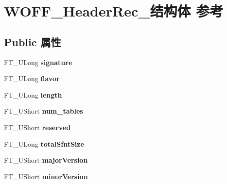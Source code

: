 \hypertarget{struct_w_o_f_f___header_rec__}{}\section{W\+O\+F\+F\+\_\+\+Header\+Rec\+\_\+结构体 参考}
\label{struct_w_o_f_f___header_rec__}
\subsection*{Public 属性}
\begin{DoxyCompactItemize}
\item 
\mbox{\label{struct_w_o_f_f___header_rec___a4ecfcefa20b9b5c897d82727293e7111}} 
F\+T\+\_\+\+U\+Long {\bfseries signature}
\item 
\mbox{\label{struct_w_o_f_f___header_rec___ac805e897e024bfe4cd363f09138e2a5a}} 
F\+T\+\_\+\+U\+Long {\bfseries flavor}
\item 
\mbox{\label{struct_w_o_f_f___header_rec___a7cade0fd6f387b1e618804af7d113c6a}} 
F\+T\+\_\+\+U\+Long {\bfseries length}
\item 
\mbox{\label{struct_w_o_f_f___header_rec___a50c23865dcbfe3521af337bb54f68b01}} 
F\+T\+\_\+\+U\+Short {\bfseries num\+\_\+tables}
\item 
\mbox{\label{struct_w_o_f_f___header_rec___a968e375e8e226a532ae19570b38da37c}} 
F\+T\+\_\+\+U\+Short {\bfseries reserved}
\item 
\mbox{\label{struct_w_o_f_f___header_rec___af1ab5dfddb4318368b20d2542b284fc4}} 
F\+T\+\_\+\+U\+Long {\bfseries total\+Sfnt\+Size}
\item 
\mbox{\label{struct_w_o_f_f___header_rec___a814bef54b9aedb973bec2ef4009a8031}} 
F\+T\+\_\+\+U\+Short {\bfseries major\+Version}
\item 
\mbox{\label{struct_w_o_f_f___header_rec___a39532ac80b6d675eea62b8c2f586d9e3}} 
F\+T\+\_\+\+U\+Short {\bfseries minor\+Version}

\end{DoxyCompactItemize}
